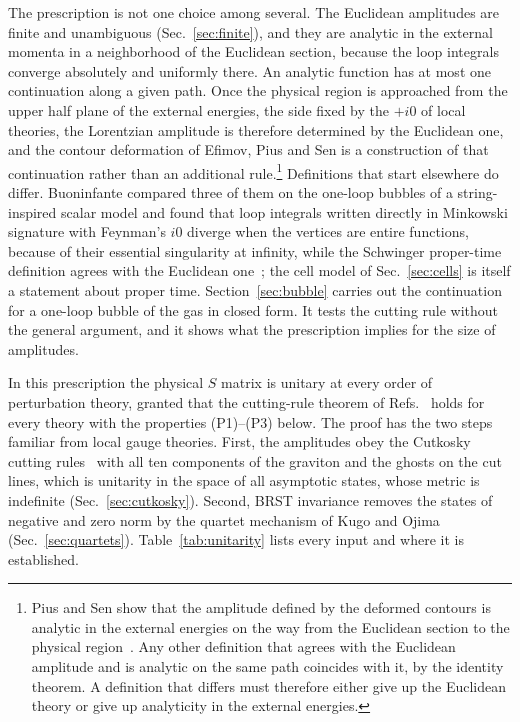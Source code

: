 \documentclass[aps,prd,10pt,twocolumn,superscriptaddress,nofootinbib,floatfix,longbibliography]{revtex4-2}
\begin{document}
The prescription is not one choice among several. The Euclidean amplitudes are finite and unambiguous (Sec.~\ref{sec:finite}), and they are analytic in the external momenta in a neighborhood of the Euclidean section, because the loop integrals converge absolutely and uniformly there. An analytic function has at most one continuation along a given path. Once the physical region is approached from the upper half plane of the external energies, the side fixed by the $+i0$ of local theories, the Lorentzian amplitude is therefore determined by the Euclidean one, and the contour deformation of Efimov, Pius and Sen is a construction of that continuation rather than an additional rule.\footnote{Pius and Sen show that the amplitude defined by the deformed contours is analytic in the external energies on the way from the Euclidean section to the physical region~\cite{PiusSen2016}. Any other definition that agrees with the Euclidean amplitude and is analytic on the same path coincides with it, by the identity theorem. A definition that differs must therefore either give up the Euclidean theory or give up analyticity in the external energies.} Definitions that start elsewhere do differ. Buoninfante compared three of them on the one-loop bubbles of a string-inspired scalar model and found that loop integrals written directly in Minkowski signature with Feynman's $i0$ diverge when the vertices are entire functions, because of their essential singularity at infinity, while the Schwinger proper-time definition agrees with the Euclidean one~\cite{Buoninfante2022}; the cell model of Sec.~\ref{sec:cells} is itself a statement about proper time. Section~\ref{sec:bubble} carries out the continuation for a one-loop bubble of the gas in closed form. It tests the cutting rule without the general argument, and it shows what the prescription implies for the size of amplitudes.

In this prescription the physical $S$ matrix is unitary at every order of perturbation theory, granted that the cutting-rule theorem of Refs.~\cite{PiusSen2016,BrisceseModesto2019} holds for every theory with the properties (P1)--(P3) below. The proof has the two steps familiar from local gauge theories. First, the amplitudes obey the Cutkosky cutting rules~\cite{Cutkosky1960} with all ten components of the graviton and the ghosts on the cut lines, which is unitarity in the space of all asymptotic states, whose metric is indefinite (Sec.~\ref{sec:cutkosky}). Second, BRST invariance removes the states of negative and zero norm by the quartet mechanism of Kugo and Ojima (Sec.~\ref{sec:quartets}). Table~\ref{tab:unitarity} lists every input and where it is established.
\end{document}
